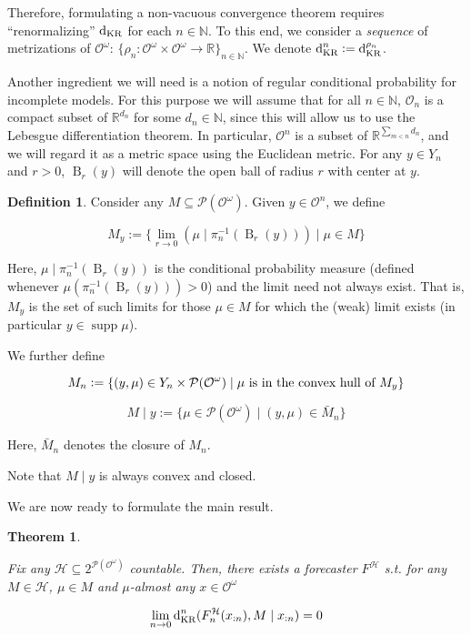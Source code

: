 \documentclass[11pt]{article}
\theoremstyle{definition}
\newtheorem{definition}{Definition}%
\theoremstyle{plain}
\newtheorem{theorem}{Theorem}%
\newcommand{\Nats}{\mathbb{N}}
\newcommand{\Reals}{\mathbb{R}}
\newcommand{\Sq}[2]{\{#1\}_{#2 \in \Nats}}
\newcommand{\Sqn}[1]{\Sq{#1}{n}}
\newcommand{\B}{\operatorname{B}}
\newcommand{\PM}{\mathcal{P}}
\DeclareMathOperator{\Sp}{supp}
\newcommand{\DKR}{\operatorname{d}_{\textnormal{KR}}}
\newcommand{\Ob}{\mathcal{O}}
\newcommand{\OO}{\Ob^\omega}
\newcommand{\PMO}{\PM(\OO)}
\newcommand{\MC}{\mathcal{H}}
\begin{document}
Therefore, formulating a non-vacuous convergence theorem requires \enquote{renormalizing} $\DKR$ for each $n \in \Nats$. To this end, we consider a \emph{sequence} of metrizations of $\OO$: $\Sqn{\rho_n: \OO \times \OO \rightarrow \Reals}$. We denote $\DKR^n:=\DKR^{\rho_n}$.

Another ingredient we will need is a notion of regular conditional probability for incomplete models. For this purpose we will assume that for all $n \in \Nats$, $\Ob_n$ is a compact subset of $\Reals^{d_n}$ for some $d_n \in \Nats$, since this will allow us to use the Lebesgue differentiation theorem. In particular, $\Ob^n$ is a subset of $\Reals^{\sum_{m < n} d_n}$, and we will regard it as a metric space using the Euclidean metric. For any $y \in Y_n$ and $r > 0$, $\B_r(y)$ will denote the open ball of radius $r$ with center at $y$.

\begin{definition}

Consider any $M \subseteq \PMO$. Given $y \in \Ob^n$, we define

\begin{equation}
M_y:=\{\lim_{r \rightarrow 0}{(\mu \mid \pi_n^{-1}(\B_r(y)))} \mid \mu \in M\}
\end{equation}

Here, $\mu \mid \pi_n^{-1}(\B_r(y))$ is the conditional probability measure (defined whenever $\mu(\pi_n^{-1}(\B_r(y))) > 0$) and the limit need not always exist. That is, $M_y$ is the set of such limits for those $\mu \in M$ for which the (weak) limit exists (in particular $y \in \Sp{\mu}$).

We further define

\begin{equation}
M_n:=\{(y,\mu) \in Y_n \times \PMO \mid \mu \textnormal{ is in the convex hull of } M_y\}
\end{equation}

\begin{equation}
M \mid y:=\{\mu \in \PMO \mid (y,\mu) \in \bar{M}_n\}
\end{equation}

Here, $\bar{M}_n$ denotes the closure of $M_n$.

\end{definition}

Note that $M \mid y$ is always convex and closed.

We are now ready to formulate the main result.

\begin{theorem}
\label{thm:main}

Fix any $\MC \subseteq 2^{\PMO}$ countable. Then, there exists a forecaster $F^\MC$ s.t. for any $M \in \MC$, $\mu \in M$ and $\mu$-almost any $x \in \OO$

\begin{equation}
\lim_{n \rightarrow 0} \DKR^n(F^\MC_n(x_{:n}), M \mid x_{:n}) = 0
\end{equation}

\end{theorem}
\end{document}
